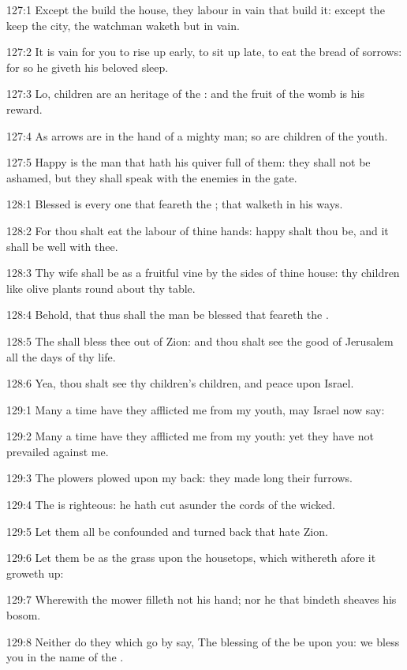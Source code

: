 127:1 Except the \LORD build the house, they labour in vain that build it: except the \LORD keep the city, the watchman waketh but in vain.

127:2 It is vain for you to rise up early, to sit up late, to eat the bread of sorrows: for so he giveth his beloved sleep.

127:3 Lo, children are an heritage of the \LORD: and the fruit of the womb is his reward.

127:4 As arrows are in the hand of a mighty man; so are children of the youth.

127:5 Happy is the man that hath his quiver full of them: they shall not be ashamed, but they shall speak with the enemies in the gate.



128:1 Blessed is every one that feareth the \LORD; that walketh in his ways.

128:2 For thou shalt eat the labour of thine hands: happy shalt thou be, and it shall be well with thee.

128:3 Thy wife shall be as a fruitful vine by the sides of thine house: thy children like olive plants round about thy table.

128:4 Behold, that thus shall the man be blessed that feareth the \LORD.

128:5 The \LORD shall bless thee out of Zion: and thou shalt see the good of Jerusalem all the days of thy life.

128:6 Yea, thou shalt see thy children's children, and peace upon Israel.



129:1 Many a time have they afflicted me from my youth, may Israel now say:

129:2 Many a time have they afflicted me from my youth: yet they have not prevailed against me.

129:3 The plowers plowed upon my back: they made long their furrows.

129:4 The \LORD is righteous: he hath cut asunder the cords of the wicked.

129:5 Let them all be confounded and turned back that hate Zion.

129:6 Let them be as the grass upon the housetops, which withereth afore it groweth up:

129:7 Wherewith the mower filleth not his hand; nor he that bindeth sheaves his bosom.

129:8 Neither do they which go by say, The blessing of the \LORD be upon you: we bless you in the name of the \LORD.




